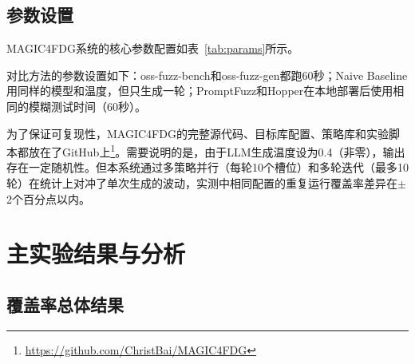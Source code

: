 \subsection{参数设置}

MAGIC4FDG系统的核心参数配置如表~\ref{tab:params}所示。

\begin{table}[H]
    \centering
    \caption{MAGIC4FDG参数设置}
    \label{tab:params}
\end{table}

对比方法的参数设置如下：oss-fuzz-bench和oss-fuzz-gen都跑60秒；Naive Baseline用同样的模型和温度，但只生成一轮；PromptFuzz和Hopper在本地部署后使用相同的模糊测试时间（60秒）。

为了保证可复现性，MAGIC4FDG的完整源代码、目标库配置、策略库和实验脚本都放在了GitHub上\footnote{\url{https://github.com/ChristBai/MAGIC4FDG}}。需要说明的是，由于LLM生成温度设为0.4（非零），输出存在一定随机性。但本系统通过多策略并行（每轮10个槽位）和多轮迭代（最多10轮）在统计上对冲了单次生成的波动，实测中相同配置的重复运行覆盖率差异在$\pm$2个百分点以内。

\section{主实验结果与分析}

\subsection{覆盖率总体结果}

